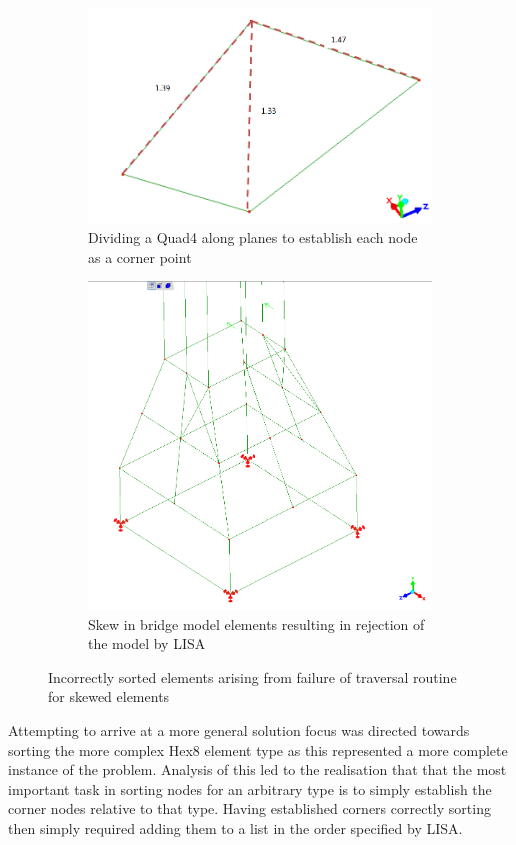 \begin{figure}[!h]
\centering
\begin{subfigure}{.5\textwidth}
  \centering
  \includegraphics[width=0.9\linewidth]{../Graphics/SkewedElementIssues.png}
  \caption{Dividing a Quad4 along planes to establish each node as a corner point}
  \label{fig:sub1}
\end{subfigure}%
\begin{subfigure}{.5\textwidth}
  \centering
  \includegraphics[width=0.7\linewidth]{../Graphics/ElementSkewOnBridge.png}
  \caption{Skew in bridge model elements resulting in rejection of the model by LISA}
  \label{fig:sub2}
\end{subfigure}
\caption{Incorrectly sorted elements arising from failure of traversal routine for skewed elements}
\label{fig:test}
\end{figure}



\noindent
Attempting to arrive at a more general solution focus was directed towards sorting the more complex Hex8 element type as this represented a more complete instance of the problem. Analysis of this led to the realisation that that the most important task in sorting nodes for an arbitrary type is to simply establish the corner nodes relative to that type. Having established corners correctly sorting then simply required adding them to a list in the order specified by LISA. \\

